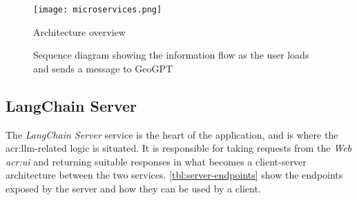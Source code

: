 \begin{figure}[h]
    \centering
    \texttt{[image: microservices.png]}
    \caption{Architecture overview}
    \label{fig:architecture-overview}
\end{figure}

\begin{figure}
    \caption{Sequence diagram showing the information flow as the user loads and sends a message to GeoGPT}
    \label{fig:sequence-diagram}
\end{figure}



\subsection{LangChain Server}\label{subsec:langchain-server}

The \textit{LangChain Server} service is the heart of the application, and is where the \gls{acr:llm}-related logic is situated. It is responsible for taking requests from the \textit{Web \acrshort{acr:ui}} and returning suitable responses in what becomes a client-server architecture between the two services. \autoref{tbl:server-endpoints} show the endpoints exposed by the server and how they can be used by a client.

